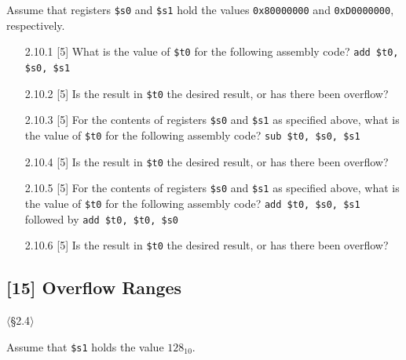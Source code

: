 \noindent Assume that registers \texttt{\$s0} and \texttt{\$s1} hold the
values \texttt{0x80000000} and \texttt{0xD0000000}, respectively.

\begin{enumerate}
  \item[2.10.1] [5] What is the value of \texttt{\$t0} for the following assembly
        code? \quad \texttt{add \$t0, \$s0, \$s1}
  \item[2.10.2] [5] Is the result in \texttt{\$t0} the desired result, or has
        there been overflow?
  \item[2.10.3] [5] For the contents of registers \texttt{\$s0} and
        \texttt{\$s1} as specified above, what is the value of \texttt{\$t0}
        for the following assembly code? \quad \texttt{sub \$t0, \$s0, \$s1}
  \item[2.10.4] [5] Is the result in \texttt{\$t0} the desired result, or has
        there been overflow?
  \item[2.10.5] [5] For the contents of registers \texttt{\$s0} and
        \texttt{\$s1} as specified above, what is the value of \texttt{\$t0}
        for the following assembly code?
        \quad \texttt{add \$t0, \$s0, \$s1} \quad followed by
        \quad \texttt{add \$t0, \$t0, \$s0}
  \item[2.10.6] [5] Is the result in \texttt{\$t0} the desired result, or has
        there been overflow?
\end{enumerate}

\problembreak

\subsection{[15] Overflow Ranges}
\hypertarget{prob-2.11}{}
\noindent$\langle$\S2.4$\rangle$\medskip

\noindent Assume that \texttt{\$s1} holds the value $128_{10}$.

